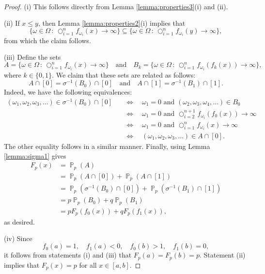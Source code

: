 \documentclass[10pt,a4paper]{amsart}
\DeclareMathOperator{\bigcomp}{\bigcirc}
\DeclareMathOperator{\prob}{\mathbb{P}}
\begin{document}
\begin{proof}
(i) This follows directly from Lemma \ref{lemma:properties3}(i) and (ii).

(ii) If $x \leq y$, then Lemma \ref{lemma:properties2}(i) implies that
\[
\{ \omega \in \Omega \,:\, \bigcomp_{i=1}^n f_{\omega_i}(x) \to \infty \}
	\subseteq
	\{ \omega \in \Omega \,:\, \bigcomp_{i=1}^n f_{\omega_i}(y) \to \infty \},
\]
from which the claim follows.

(iii) Define the sets
\[
A = \{ \omega \in \Omega \,:\, \bigcomp_{i=1}^n f_{\omega_i}(x) \to \infty \}
\quad\text{and}\quad
B_k = \{ \omega \in \Omega \,:\, \bigcomp_{i=1}^n f_{\omega_i}(f_k(x)) \to \infty \},
\]
where $k \in \{0,1\}$. We claim that these sets are related as follows:
\[
A \cap [0] = \sigma^{-1}(B_0) \cap [0]
\quad\text{and}\quad
A \cap [1] = \sigma^{-1}(B_1) \cap [1].
\]
Indeed, we have the following equivalences:
\[
\begin{split}
(\omega_1,\omega_2,\omega_3,\dots) \in \sigma^{-1}(B_0) \cap [0]
	& \quad\Leftrightarrow\quad \omega_1 = 0 \text{ and } (\omega_2,\omega_3,\omega_4,\dots) \in B_0 \\
	& \quad\Leftrightarrow\quad \omega_1 = 0 \text{ and } \bigcomp_{i=2}^{n+1} f_{\omega_i}(f_0(x)) \to \infty \\
	& \quad\Leftrightarrow\quad \omega_1 = 0 \text{ and } \bigcomp_{i=1}^{n} f_{\omega_i}(x) \to \infty \\
	& \quad\Leftrightarrow\quad (\omega_1,\omega_2,\omega_3,\dots) \in A \cap [0].
\end{split}
\]
The other equality follows in a similar manner. Finally, using Lemma \ref{lemma:sigma1} gives
\[
\begin{split}
F_p(x)
	& = \prob_p(A) \\
	& = \prob_p(A \cap [0]) + \prob_p(A \cap [1]) \\
	& = \prob_p(\sigma^{-1}(B_0) \cap [0]) + \prob_p(\sigma^{-1}(B_1) \cap [1]) \\
	& = p\prob_p(B_0) + q\prob_p(B_1) \\
	& = pF_p(f_0(x)) + qF_p(f_1(x)),
\end{split}
\]
as desired.

(iv) Since
\[
f_0(a)=1, \quad
f_1(a)<0, \quad
f_0(b)>1, \quad
f_1(b)=0,
\]
it follows from statements (i) and (iii) that $F_p(a) = F_p(b) = p$. Statement (ii) implies that $F_p(x)=p$ for all $x \in [a,b]$.


\end{proof}
\end{document}
